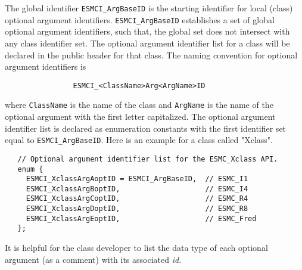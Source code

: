 The global identifier \texttt{ESMCI\_ArgBaseID} is the starting identifier for
local (class) optional argument identifiers. \texttt{ESMCI\_ArgBaseID}
establishes a set of global optional argument identifiers, such that, the global
set does not intersect with any class identifier set.
The optional argument identifier list for a class will be declared in the public
header for that class. The naming convention for optional argument identifiers
is
\begin{verbatim}
                ESMCI_<ClassName>Arg<ArgName>ID
\end{verbatim}
where \texttt{ClassName} is the
name of the class and \texttt{ArgName} is the name of the optional argument with
the first letter capitalized. The optional argument identifier list is declared
as enumeration constants with the first identifier set equal to
\texttt{ESMCI\_ArgBaseID}. Here is an example for a class called "Xclass".
\begin{verbatim}
   // Optional argument identifier list for the ESMC_Xclass API.
   enum {
     ESMCI_XclassArgAoptID = ESMCI_ArgBaseID,  // ESMC_I1
     ESMCI_XclassArgBoptID,                    // ESMC_I4
     ESMCI_XclassArgCoptID,                    // ESMC_R4
     ESMCI_XclassArgDoptID,                    // ESMC_R8
     ESMCI_XclassArgEoptID,                    // ESMC_Fred
   };
\end{verbatim}
\noindent
It is helpful for the class developer to list the data type of
each optional argument (as a comment) with its associated \textit{id}.
\newline

